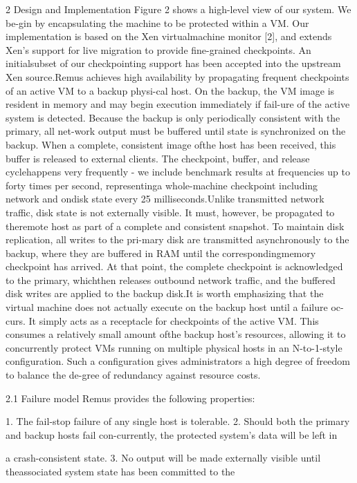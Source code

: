 2 Design and Implementation
Figure 2 shows a high-level view of our system. We be-gin by encapsulating the machine to be protected within
a VM. Our implementation is based on the Xen virtualmachine monitor [2], and extends Xen's support for live
migration to provide fine-grained checkpoints. An initialsubset of our checkpointing support has been accepted
into the upstream Xen source.Remus achieves high availability by propagating frequent checkpoints of an active VM to a backup physi-cal host. On the backup, the VM image is resident in
memory and may begin execution immediately if fail-ure of the active system is detected. Because the backup
is only periodically consistent with the primary, all net-work output must be buffered until state is synchronized
on the backup. When a complete, consistent image ofthe host has been received, this buffer is released to external clients. The checkpoint, buffer, and release cyclehappens very frequently - we include benchmark results
at frequencies up to forty times per second, representinga whole-machine checkpoint including network and ondisk state every 25 milliseconds.Unlike transmitted network traffic, disk state is not externally visible. It must, however, be propagated to theremote host as part of a complete and consistent snapshot. To maintain disk replication, all writes to the pri-mary disk are transmitted asynchronously to the backup,
where they are buffered in RAM until the correspondingmemory checkpoint has arrived. At that point, the complete checkpoint is acknowledged to the primary, whichthen releases outbound network traffic, and the buffered
disk writes are applied to the backup disk.It is worth emphasizing that the virtual machine does
not actually execute on the backup host until a failure oc-curs. It simply acts as a receptacle for checkpoints of the
active VM. This consumes a relatively small amount ofthe backup host's resources, allowing it to concurrently
protect VMs running on multiple physical hosts in an N-to-1-style configuration. Such a configuration gives administrators a high degree of freedom to balance the de-gree of redundancy against resource costs.

2.1 Failure model
Remus provides the following properties:

1. The fail-stop failure of any single host is tolerable.
2. Should both the primary and backup hosts fail con-currently, the protected system's data will be left in

a crash-consistent state.
3. No output will be made externally visible until theassociated system state has been committed to the

